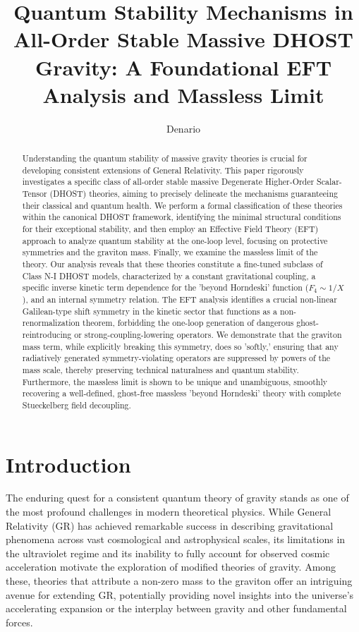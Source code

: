 \documentclass[twocolumn]{aastex631}
\begin{document}
\title{Quantum Stability Mechanisms in All-Order Stable Massive DHOST Gravity: A Foundational EFT Analysis and Massless Limit}

\author{Denario}

\begin{abstract}
Understanding the quantum stability of massive gravity theories is crucial for developing consistent extensions of General Relativity. This paper rigorously investigates a specific class of all-order stable massive Degenerate Higher-Order Scalar-Tensor (DHOST) theories, aiming to precisely delineate the mechanisms guaranteeing their classical and quantum health. We perform a formal classification of these theories within the canonical DHOST framework, identifying the minimal structural conditions for their exceptional stability, and then employ an Effective Field Theory (EFT) approach to analyze quantum stability at the one-loop level, focusing on protective symmetries and the graviton mass. Finally, we examine the massless limit of the theory. Our analysis reveals that these theories constitute a fine-tuned subclass of Class N-I DHOST models, characterized by a constant gravitational coupling, a specific inverse kinetic term dependence for the 'beyond Horndeski' function ($F_4 \sim 1/X$), and an internal symmetry relation. The EFT analysis identifies a crucial non-linear Galilean-type shift symmetry in the kinetic sector that functions as a non-renormalization theorem, forbidding the one-loop generation of dangerous ghost-reintroducing or strong-coupling-lowering operators. We demonstrate that the graviton mass term, while explicitly breaking this symmetry, does so 'softly,' ensuring that any radiatively generated symmetry-violating operators are suppressed by powers of the mass scale, thereby preserving technical naturalness and quantum stability. Furthermore, the massless limit is shown to be unique and unambiguous, smoothly recovering a well-defined, ghost-free massless 'beyond Horndeski' theory with complete Stueckelberg field decoupling.
\end{abstract}

\keywords{}


\section{Introduction}
\label{sec:intro}

The enduring quest for a consistent quantum theory of gravity stands as one of the most profound challenges in modern theoretical physics. While General Relativity (GR) has achieved remarkable success in describing gravitational phenomena across vast cosmological and astrophysical scales, its limitations in the ultraviolet regime and its inability to fully account for observed cosmic acceleration motivate the exploration of modified theories of gravity. Among these, theories that attribute a non-zero mass to the graviton offer an intriguing avenue for extending GR, potentially providing novel insights into the universe's accelerating expansion or the interplay between gravity and other fundamental forces.
\end{document}
